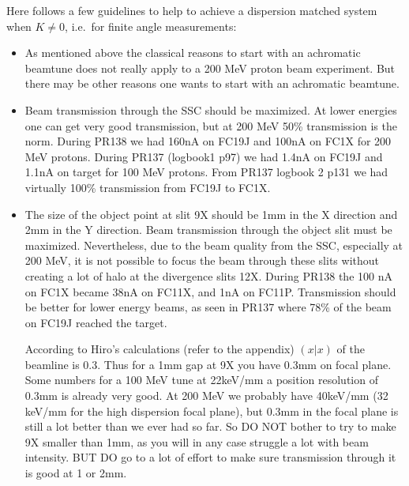 \documentclass[11pt]{report}
\begin{document}
\bigskip
\noindent Here follows a few guidelines to help to achieve a dispersion matched system when $K\neq0$, i.e.~for 
finite angle measurements:
\begin{itemize}


\item As mentioned above the classical reasons to start with
      an achromatic beamtune does not really apply to a 200 MeV proton beam experiment.
      But there may be other reasons one wants to start with an achromatic beamtune.
\item Beam transmission through the SSC should be maximized. At lower energies one can
      get very good transmission, but at 200 MeV 50\% transmission is the norm.
      During PR138 we had 160nA on FC19J and 100nA on FC1X for 200 MeV protons.
      During PR137 (logbook1 p97) we had 1.4nA on FC19J and 1.1nA on target for 100 MeV protons.
      From PR137 logbook 2 p131 we had virtually 100\% transmission from FC19J to FC1X.
\item The size of the object point at slit 9X should be 1mm in the X direction and 2mm in the Y direction. 
      Beam transmission through the object slit must be maximized. 
      Nevertheless, due to the beam quality from the SSC, especially at 200 MeV, it is not possible to focus
      the beam through these slits without creating a lot of halo at the divergence slits 12X.
      During PR138 the 100 nA on FC1X became 38nA on FC11X, and 1nA on FC11P.
      Transmission should be better for lower energy beams, as seen in PR137 where 78\% of the beam
      on FC19J reached the target.

      According to Hiro's calculations (refer to the appendix) $(x|x)$ of the beamline is 0.3.
      Thus for a 1mm gap at 9X you have 0.3mm on focal plane. 
      Some numbers for a 100 MeV tune at 22keV/mm a position resolution of 0.3mm is already very good.
      At 200 MeV we probably have 40keV/mm (32 keV/mm for the high dispersion focal plane), 
	but 0.3mm in the focal plane is still      a lot better than we ever had so far.
      So DO NOT bother to try to make 9X smaller than 1mm, as you will in any case struggle a lot with beam intensity.
      BUT DO go to a lot of effort to make sure transmission through it is good
      at 1 or 2mm.


\end{itemize}
\end{document}
